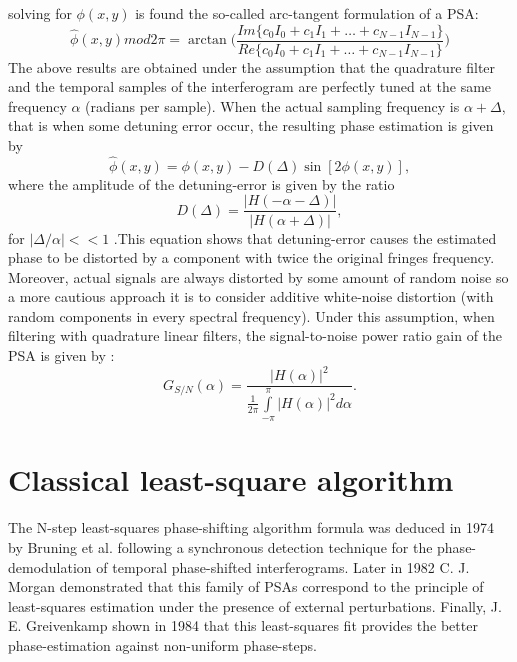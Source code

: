 solving for $\phi(x,y)$ is found the so-called arc-tangent formulation of a PSA:
\begin{equation}
 \hat{\phi}(x,y) mod 2\pi= \arctan \Bigg(\frac{Im\{c_0I_0+c_1I_1 + \dots + c_{N-1}
I_{N-1}\}}{Re\{c_0I_0+c_1I_1 + \dots + c_{N-1} I_{N-1}\}}  \Bigg)
\end{equation}
The above results are obtained under the assumption that the quadrature filter
and the temporal samples of the interferogram are perfectly tuned at the same
frequency $\alpha$ (radians per sample). When the actual sampling frequency is
$\alpha+\Delta$, that is when some detuning error occur, the resulting phase 
estimation is given by
\begin{equation}
 \hat{\phi}(x,y)=\phi(x,y)-D(\Delta)\sin[2\phi(x,y)],
\end{equation}
where the amplitude of the detuning-error is given by the ratio
\begin{equation}
 D(\Delta)=\frac{|H(-\alpha-\Delta)|}{|H(\alpha+\Delta)|},
\end{equation}
for $|\Delta/\alpha|<<1$ \cite{Mosino:09,Mosino:10}.This equation shows that detuning-error causes the 
estimated phase to be distorted by a component with twice the original fringes 
frequency. Moreover, actual signals are always distorted by some amount of random
noise so a more cautious approach it is to consider additive white-noise 
distortion (with random components in every spectral frequency). Under this 
assumption, when filtering with quadrature linear filters, the signal-to-noise 
power ratio gain of the PSA is given by \cite{Servin:09}:
\begin{equation}
 G_{S/N}(\alpha)=\frac{|H(\alpha)|^2}{\frac{1}{2\pi}\int\limits_{-\pi}^{\pi}
|H(\alpha)|^2 d\alpha}.
\end{equation}

\section{Classical least-square algorithm}

The N-step least-squares phase-shifting algorithm formula was deduced in
1974 by Bruning et al. \cite{Bruning:74} following a synchronous detection 
technique for the phase-demodulation of temporal phase-shifted interferograms. 
Later in 1982 C. J. Morgan \cite{Morgan} demonstrated that this family of PSAs 
correspond to the principle of least-squares estimation under the presence of 
external perturbations. Finally, J. E. Greivenkamp \cite{Greivenkamp} shown in 
1984 that this least-squares fit provides the better phase-estimation against 
non-uniform phase-steps.

